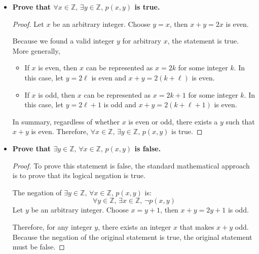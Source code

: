 \begin{solutions*}
     \fixlistskip
    \begin{itemize}
        \item \textbf{Prove that $\forall x \in \mathbb{Z},\, \exists y \in \mathbb{Z},\, p(x,y)$ is true.}

        \begin{proof}
            Let $x$ be an arbitrary integer. Choose $y = x$, then $x + y = 2x$ is even.

            Because we found a valid integer $y$ for arbitrary $x$, the statement is true. More generally,
            \begin{itemize}
                \item If $x$ is even, then $x$ can be represented as $x = 2k$ for some integer $k$. In this case, let $y = 2\ell$ is even and $x + y = 2(k + \ell)$ is even.
                \item If $x$ is odd, then $x$ can be represented as $x = 2k+1$ for some integer $k$. In this case, let $y = 2\ell + 1$ is odd and $x + y = 2(k + \ell + 1)$ is even.
            \end{itemize}
            In summary, regardless of whether $x$ is even or odd, there exists a $y$ such that $x + y$ is even. Therefore, $\forall x \in \mathbb{Z},\, \exists y \in \mathbb{Z},\, p(x,y)$ is true.
        \end{proof}

        \item \textbf{Prove that $\exists y \in \mathbb{Z},\, \forall x \in \mathbb{Z},\, p(x,y)$ is false.}

        \begin{proof}
            To prove this statement is false, the standard mathematical approach is to prove that its logical negation is true.
            
            The negation of $\exists y \in \mathbb{Z},\, \forall x \in \mathbb{Z},\, p(x,y)$ is:
            \[\forall y \in \mathbb{Z},\, \exists x \in \mathbb{Z},\, \neg p(x,y)\]
            Let $y$ be an arbitrary integer. Choose $x = y+1$, then $x + y = 2y+1$ is odd.

            Therefore, for any integer $y$, there exists an integer $x$ that makes $x+y$ odd. Because the negation of the original statement is true, the original statement must be false. 
        \end{proof}
    \end{itemize}
\end{solutions*}
